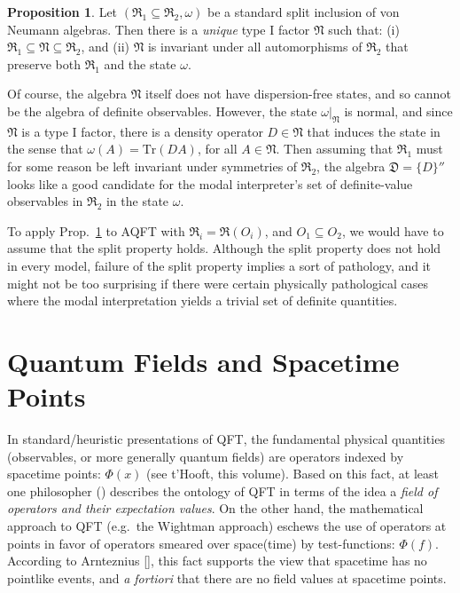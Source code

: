 \documentclass[11pt]{article}
\theoremstyle{definition}
\newtheorem{prop}[thm]{Proposition}
\theoremstyle{definition}
\theoremstyle{remark}
\def\al#1{{\mathfrak #1}}
\def\om{\omega} \def\Om{\Omega} \def\dd{\partial} \def\D{\Delta}
\newcommand{\tr}{\mathrm{Tr}}
\begin{document}
\begin{prop} Let $(\al R_1\subseteq \al R_2 ,\om )$ be
  a standard split inclusion of von Neumann algebras.
  Then there is a \emph{unique} type I factor $\al N$
  such that: (i) $\al R_1\subseteq \al N\subseteq \al
  R_2$, and (ii) $\al N$ is invariant under all
  automorphisms of $\al R_2$ that preserve both $\al
  R_1$ and the state $\om$. \label{midd} \end{prop}

Of course, the algebra $\al N$ itself does not have dispersion-free
states, and so cannot be the algebra of definite observables.
However, the state $\om |_{\al N}$ is normal, and since $\al N$ is a
type I factor, there is a density operator $D\in \al N$ that induces
the state in the sense that $\om (A)=\tr (DA)$, for all $A\in \al N$.
Then assuming that $\al R_1$ must for some reason be left invariant
under symmetries of $\al R_2$, the algebra $\al D =\{ D\}''$ looks
like a good candidate for the modal interpreter's set of
definite-value observables in $\al R_2$ in the state $\om$.

To apply Prop.\ \ref{midd} to AQFT with $\al R_i=\al R(O_i)$, and
$O_1\subseteq O_2$, we would have to assume that the split property
holds.  Although the split property does not hold in every model,
failure of the split property implies a sort of pathology, and it
might not be too surprising if there were certain physically
pathological cases where the modal interpretation yields a trivial set
of definite quantities.



\bigskip {}


\section{Quantum Fields and Spacetime Points} \label{pointy}

In standard/heuristic presentations of QFT, the fundamental physical
quantities (observables, or more generally quantum fields) are
operators indexed by spacetime points: $\Phi (x)$ (see t'Hooft, this
volume).  Based on this fact, at least one philosopher (\cite{tell})
describes the ontology of QFT in terms of the idea a \emph{field of
  operators and their expectation values}.  On the other hand, the
mathematical approach to QFT (e.g.\ the Wightman approach) eschews the
use of operators at points in favor of operators smeared over
space(time) by test-functions: $\Phi (f)$.  According to Arnteznius
[\citeyear{franky}], this fact supports the view that spacetime has no
pointlike events, and \emph{a fortiori} that there are no field values
at spacetime points.
\end{document}
